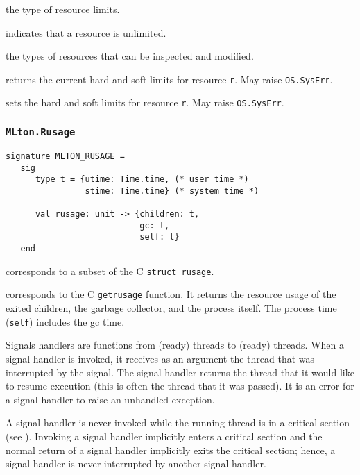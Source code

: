 \begin{description}
the type of resource limits.

indicates that a resource is unlimited.

the types of resources that can be inspected and modified.

returns the current hard and soft limits for resource {\tt r}. May
raise {\tt OS.SysErr}.

sets the hard and soft limits for resource {\tt r}.  May raise {\tt OS.SysErr}.
\end{description}
%
\subsubsection{\tt MLton.Rusage}

\begin{verbatim}
signature MLTON_RUSAGE =
   sig
      type t = {utime: Time.time, (* user time *)
                stime: Time.time} (* system time *)
         
      val rusage: unit -> {children: t,
                           gc: t,
                           self: t}
   end
\end{verbatim}

\begin{description}
corresponds to a subset of the C {\tt struct rusage}.

corresponds to the C {\tt getrusage} function.  It returns the
resource usage of the exited children, the garbage collector, and the
process itself.  The process time ({\tt self}) includes the gc time.
\end{description}

Signals handlers are functions from (ready) threads to (ready)
threads.  When a signal handler is invoked, it receives as an argument
the thread that was interrupted by the signal.  The signal handler
returns the thread that it would like to resume execution (this is
often the thread that it was passed).  It is an error for a signal
handler to raise an unhandled exception.

A signal handler is never invoked while the running thread is in a
critical section (see ).  Invoking a signal handler
implicitly enters a critical section and the normal return of a signal
handler implicitly exits the critical section; hence, a signal handler
is never interrupted by another signal handler.

